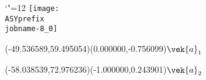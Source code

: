 \setlength{\unitlength}{1pt}%
\makeatletter%
\let\ASYencoding\f@encoding%
\let\ASYfamily\f@family%
\let\ASYseries\f@series%
\let\ASYshape\f@shape%
\makeatother%
{\catcode`"=12%
\texttt{[image: \\ASYprefix\\jobname-8\_0]}%
}%
%
%
\fontsize{8.000000}{9.600000}\selectfont%
\usefont{\ASYencoding}{\ASYfamily}{\ASYseries}{\ASYshape}%
\ASYalign(-49.536589,59.495054)(0.000000,-0.756099){$\vek{a}_1$}%
%
%
\fontsize{8.000000}{9.600000}\selectfont%
\ASYalign(-58.038539,72.976236)(-1.000000,0.243901){$\vek{a}_2$}%
